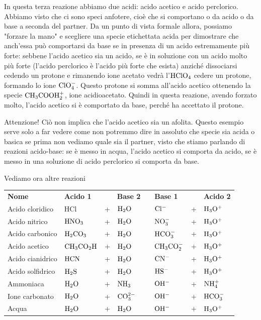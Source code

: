 \vspace{0.2cm}In questa terza reazione abbiamo due acidi: acido acetico e acido perclorico. Abbiamo visto che ci sono speci anfotere, cioè che si comportano o da acido o da base a seconda del partner. Da un punto di vista formale allora, possiamo "forzare la mano" e scegliere una specie etichettata acida per dimostrare che anch'essa può comportarsi da base se in presenza di un acido estremamente più forte: sebbene l'acido acetico sia un acido, se è in soluzione con un acido molto più forte (l'acido perclorico è l'acido più forte che esista) anziché dissociarsi cedendo un protone e rimanendo ione acetato vedrà l'$\rm HClO_4$ cedere un protone, formando lo ione $\rm ClO_4^-$. Questo protone si somma all'acido acetico ottenendo la specie $\rm CH_3COOH_2^+$, ione acidioacetato. Quindi in questa reazione, avendo forzato molto, l'acido acetico si è comportato da base, perché ha accettato il protone.

Attenzione! Ciò non implica che l'acido acetico sia un afolita. Questo esempio serve solo a far vedere come non potremmo dire in assoluto che specie sia acida o basica se prima non vediamo quale sia il partner, visto che stiamo parlando di reazioni acido-base: se è messo in acqua, l'acido acetico si comporta da acido, se è messo in una soluzione di acido perclorico si comporta da base.

\vspace{0.2cm}Vediamo ora altre reazioni

\begin{center}
    \begin{tabular}{llllllll}
        \textbf{Nome} & \textbf{Acido 1} & & \textbf{Base 2} & & \textbf{Base 1} & & \textbf{Acido 2}\\[0.3ex]
        Acido cloridico & HCl & + & $\rm H_2O$ & \ce{<-->} & $\rm Cl^-$ & + & $\rm H_3O^+$\\[0.3ex]
        Acido nitrico & $\rm HNO_3$ & + & $\rm H_2O$ & \ce{<-->} & $\rm NO_3^-$ & + & $\rm H_3O^+$\\[0.3ex]
        Acido carbonico & $\rm H_2CO_3$ & + & $\rm H_2O$ & \ce{<-->} & $\rm HCO_3^-$ & + & $\rm H_3O^+$\\[0.3ex]
        Acido acetico & $\rm CH_3CO_2H$ & + & $\rm H_2O$ & \ce{<-->} & $\rm CH_3CO_2^-$ & + & $\rm H_3O^+$\\[0.3ex]
        Acido cianidrico & $\rm HCN$ & + & $\rm H_2O$ & \ce{<-->} & $\rm CN^-$ & + & $\rm H_3O^+$\\[0.3ex]
        Acido solfidrico & $\rm H_2S$ & + & $\rm H_2O$ & \ce{<-->} & $\rm HS^-$ & + & $\rm H_3O^+$\\[0.3ex]
        Ammoniaca & $\rm H_2O$ & + & $\rm NH_3$ & \ce{<-->} & $\rm OH^-$ & + & $\rm NH_4^+$\\[0.3ex]
        Ione carbonato & $\rm H_2O$ & + & $\rm CO_3^{2-}$ & \ce{<-->} & $\rm OH^-$ & + & $\rm HCO_3^-$\\[0.3ex]
        Acqua & $\rm H_2O$ & + & $\rm H_2O$ & \ce{<-->} & $\rm OH^-$ & + & $\rm H_3O^+$\\[0.3ex]
    \end{tabular}
\end{center}

